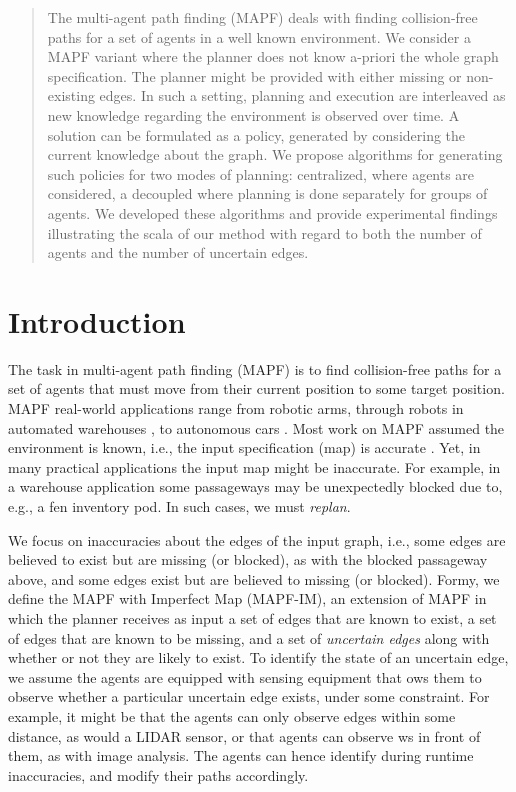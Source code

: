 \documentclass[letterpaper]{article} %
\def\
UrlFont{\rm}  %
\theoremstyle{definition}
\begin{document}
\begin{abstract}
{The multi-agent path finding (MAPF) deals with finding collision-free paths for a set of agents in a well known environment. We consider a MAPF variant where the planner does not know a-priori the whole graph specification. The planner might be provided with either missing or non-existing edges. In such a setting, planning and execution are interleaved as new knowledge regarding the environment is observed over time. A solution can be formulated as a policy, generated by considering the current knowledge about the graph. We propose algorithms for generating such policies for two modes of planning: centralized, where  agents are considered, a decoupled where planning is done separately for groups of agents. We developed these algorithms and provide experimental findings illustrating the scala of our method with regard to both the number of agents and the number of uncertain edges.
}

\end{abstract}

\section{Introduction}

The task in multi-agent path finding (MAPF) is to find collision-free paths for a set of agents that must move from their current position to some target position. MAPF real-world applications range from robotic arms, through robots in automated warehouses \cite{wurman2008coordinating}, to autonomous cars \cite{veloso2015cobots}.
Most work on MAPF assumed the environment is known, i.e., the input specification (map) is accurate \cite{stern2019multi}.
Yet, in many practical applications the input map might be inaccurate. For example, in a warehouse application some passageways may be unexpectedly blocked due to, e.g., a fen inventory pod.
In such cases, we must {\em replan}. %


We focus on inaccuracies about the edges of the input graph, i.e., some edges are believed to exist but are missing (or blocked), as with the blocked passageway above, and some edges exist but are believed to missing (or blocked). %
Formy, we define the MAPF with Imperfect Map (MAPF-IM), an extension of MAPF in which the planner receives as input a set of edges that are known to exist, a set of edges that are known to be missing, and a set of \emph{uncertain edges} along with whether or not they are likely to exist. To identify the state of an uncertain edge, we assume the agents are equipped with sensing equipment that ows them to observe whether a particular uncertain edge exists, under some constraint. For example, it might be that the agents can only observe edges within some distance, as would a LIDAR sensor, or that agents can observe ws in front of them, as with image analysis. The agents can hence identify during runtime inaccuracies, and modify their paths accordingly.
\end{document}
